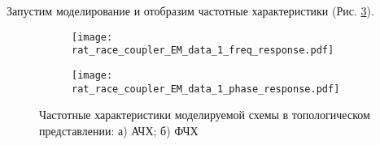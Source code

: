 Запустим моделирование и отобразим частотные характеристики (Рис. \ref{fig:rat_race_coupler_EM_data_1}).

\begin{figure}[!ht]
    \centering
    \begin{subfigure}[b]{0.45\textwidth}
        \centering
        \texttt{[image: rat\_race\_coupler\_EM\_data\_1\_freq\_response.pdf]}
        \caption{}
        \label{fig:rat_race_coupler_EM_data_1_freq_response}
    \end{subfigure}
    \hfill
    \begin{subfigure}[b]{0.45\textwidth}
        \centering
        \texttt{[image: rat\_race\_coupler\_EM\_data\_1\_phase\_response.pdf]}
        \caption{}
        \label{fig:rat_race_coupler_EM_data_1_phase_response}
    \end{subfigure}
    \caption{
        Частотные характеристики моделируемой схемы в топологическом представлении:
        а) АЧХ;
        б) ФЧХ
    }
    \label{fig:rat_race_coupler_EM_data_1}
\end{figure}

